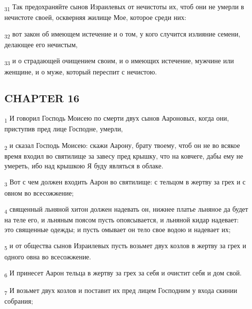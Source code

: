 \begin{tcolorbox}
\textsubscript{31} Так предохраняйте сынов Израилевых от нечистоты их, чтоб они не умерли в нечистоте своей, оскверняя жилище Мое, которое среди них:
\end{tcolorbox}
\begin{tcolorbox}
\textsubscript{32} вот закон об имеющем истечение и о том, у кого случится излияние семени, делающее его нечистым,
\end{tcolorbox}
\begin{tcolorbox}
\textsubscript{33} и о страдающей очищением своим, и о имеющих истечение, мужчине или женщине, и о муже, который переспит с нечистою.
\end{tcolorbox}
\subsection{CHAPTER 16}
\begin{tcolorbox}
\textsubscript{1} И говорил Господь Моисею по смерти двух сынов Аароновых, когда они, приступив пред лице Господне, умерли,
\end{tcolorbox}
\begin{tcolorbox}
\textsubscript{2} и сказал Господь Моисею: скажи Аарону, брату твоему, чтоб он не во всякое время входил во святилище за завесу пред крышку, что на ковчеге, дабы ему не умереть, ибо над крышкою Я буду являться в облаке.
\end{tcolorbox}
\begin{tcolorbox}
\textsubscript{3} Вот с чем должен входить Аарон во святилище: с тельцом в жертву за грех и с овном во всесожжение;
\end{tcolorbox}
\begin{tcolorbox}
\textsubscript{4} священный льняной хитон должен надевать он, нижнее платье льняное да будет на теле его, и льняным поясом пусть опоясывается, и льняной кидар надевает: это священные одежды; и пусть омывает он тело свое водою и надевает их;
\end{tcolorbox}
\begin{tcolorbox}
\textsubscript{5} и от общества сынов Израилевых пусть возьмет двух козлов в жертву за грех и одного овна во всесожжение.
\end{tcolorbox}
\begin{tcolorbox}
\textsubscript{6} И принесет Аарон тельца в жертву за грех за себя и очистит себя и дом свой.
\end{tcolorbox}
\begin{tcolorbox}
\textsubscript{7} И возьмет двух козлов и поставит их пред лицем Господним у входа скинии собрания;
\end{tcolorbox}

